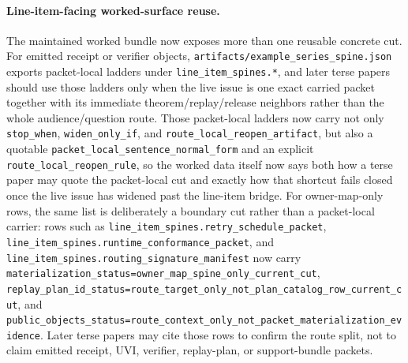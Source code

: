 \documentclass[11pt]{article}
\begin{document}
\paragraph{Line-item-facing worked-surface reuse.}
The maintained worked bundle now exposes more than one reusable concrete cut. For emitted receipt or verifier objects, \nolinkurl{artifacts/example_series_spine.json} exports packet-local ladders under \texttt{line\_item\_spines.*}, and later terse papers should use those ladders only when the live issue is one exact carried packet together with its immediate theorem/replay/release neighbors rather than the whole audience/question route. Those packet-local ladders now carry not only \texttt{stop\_when}, \texttt{widen\_only\_if}, and \texttt{route\_local\_reopen\_artifact}, but also a quotable \texttt{packet\_local\_sentence\_normal\_form} and an explicit \texttt{route\_local\_reopen\_rule}, so the worked data itself now says both how a terse paper may quote the packet-local cut and exactly how that shortcut fails closed once the live issue has widened past the line-item bridge. For owner-map-only rows, the same list is deliberately a boundary cut rather than a packet-local carrier: rows such as \texttt{line\_item\_spines.retry\_schedule\_packet}, \texttt{line\_item\_spines.runtime\_conformance\_packet}, and \texttt{line\_item\_spines.routing\_signature\_manifest} now carry \texttt{materialization\_status=owner\_map\_spine\_only\_current\_cut}, \texttt{replay\_plan\_id\_status=route\_target\_only\_not\_plan\_catalog\_row\_current\_cut}, and \texttt{public\_objects\_status=route\_context\_only\_not\_packet\_materialization\_evidence}. Later terse papers may cite those rows to confirm the route split, not to claim emitted receipt, UVI, verifier, replay-plan, or support-bundle packets.\cite{series:operationalA,series:operationalB,series:certifiedB,series:seriesspines}
\end{document}
